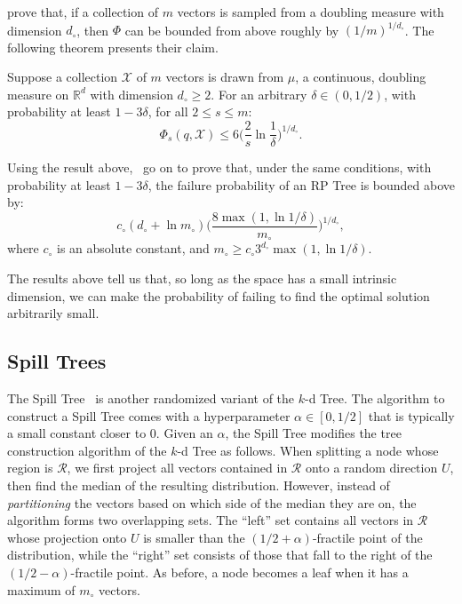 \begin{svgraybox}
\cite{dasgupta2015rptrees} prove that, if a collection of $m$ vectors is sampled
from a doubling measure with dimension $d_\circ$,
then $\Phi$ can be bounded from above roughly by $(1/m)^{1/d_\circ}$. The following
theorem presents their claim.
\end{svgraybox}

\begin{theorem}
    Suppose a collection $\mathcal{X}$ of $m$ vectors is drawn from $\mu$, a continuous, doubling measure
    on $\mathbb{R}^d$ with dimension $d_\circ \geq 2$. For an arbitrary $\delta \in (0, 1/2)$,
    with probability at least $1 - 3\delta$, for all $2 \leq s \leq m$:
    \begin{equation*}
        \Phi_s(q, \mathcal{X}) \leq 6 \Bigg( \frac{2}{s} \ln \frac{1}{\delta} \Bigg)^{1/d_\circ}.
    \end{equation*}
\end{theorem}

Using the result above,~\cite{dasgupta2015rptrees} go on to prove that,
under the same conditions, with probability at least $1 - 3\delta$,
the failure probability of an RP Tree is bounded above by:
\begin{equation*}
    c_\circ (d_\circ + \ln m_\circ) \Bigg( \frac{8 \max (1, \ln 1/\delta)}{m_\circ} \Bigg)^{1/d_\circ},
\end{equation*}
where $c_\circ$ is an absolute constant, and $m_\circ \geq c_\circ 3^{d_\circ} \max (1, \ln 1/\delta)$.

\begin{svgraybox}
The results above tell us that, so long as the space has a small intrinsic
dimension, we can make the probability of failing to find the optimal solution
arbitrarily small.
\end{svgraybox}

\subsection{Spill Trees}
The Spill Tree~\citep{liu2004SpillTree} is another randomized variant of the $k$-d Tree.
The algorithm to construct a Spill Tree comes with a hyperparameter $\alpha \in [0, 1/2]$
that is typically a small constant closer to $0$.
Given an $\alpha$, the Spill Tree modifies the tree construction algorithm of the $k$-d Tree as follows.
When splitting a node whose region is $\mathcal{R}$, we first project all vectors contained
in $\mathcal{R}$ onto a random direction $U$, then find the median of the resulting distribution.
However, instead of \emph{partitioning} the vectors based on which side of the median they are on,
the algorithm forms two overlapping sets. The ``left'' set contains all vectors in $\mathcal{R}$
whose projection onto $U$ is smaller than the $(1/2 + \alpha)$-fractile point of the distribution,
while the ``right'' set consists of those that fall to the right of the $(1/2 - \alpha)$-fractile point.
As before, a node becomes a leaf when it has a maximum of $m_\circ$ vectors.

